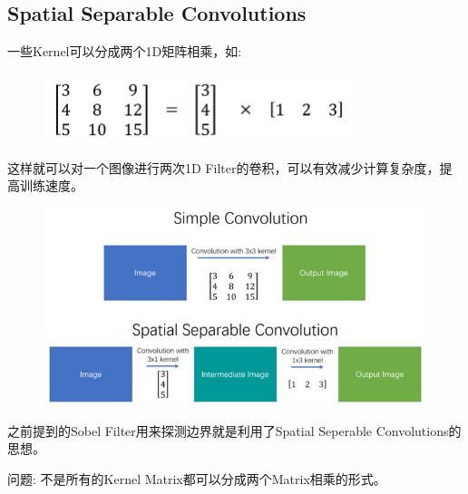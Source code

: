 \documentclass[11pt]{article}
\begin{document}
\subsection{Spatial Separable Convolutions}
一些Kernel可以分成两个1D矩阵相乘，如:
\begin{figure}[hbt!]
  \centering
  \includegraphics[width=0.8\textwidth]{assets/sep1.png}
\end{figure}
这样就可以对一个图像进行两次1D Filter的卷积，可以有效减少计算复杂度，提高训练速度。
\begin{figure}[hbt!]
  \centering
  \includegraphics[width=\textwidth]{assets/sep2.png}
\end{figure}
\begin{framed}
  \begin{center}
    之前提到的Sobel Filter用来探测边界就是利用了Spatial Seperable Convolutions的思想。
  \end{center}
\end{framed}

\begin{framed}
  \begin{center}
    问题: 不是所有的Kernel Matrix都可以分成两个Matrix相乘的形式。
  \end{center}
\end{framed}
\end{document}
